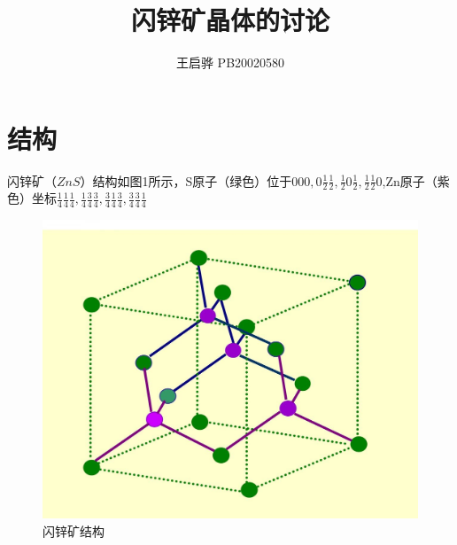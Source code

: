 \documentclass{article}
\title{\songti \zihao{2}\bfseries 闪锌矿晶体的讨论}
\author{王启骅 PB20020580}
\begin{document}
	\maketitle
		\section{结构}
	闪锌矿$ （ZnS） $结构如图1所示，S原子（绿色）位于$ 000,0\frac{1}{2}\frac{1}{2},\frac{1}{2}0\frac{1}{2},\frac{1}{2}\frac{1}{2}0 $,Zn原子（紫色）坐标$ \frac{1}{4}\frac{1}{4}\frac{1}{4},\frac{1}{4}\frac{3}{4}\frac{3}{4},\frac{3}{4}\frac{1}{4}\frac{3}{4},\frac{3}{4}\frac{3}{4}\frac{1}{4} $
	\begin{figure}[!h]
		
		\centering
		\includegraphics[scale=0.2]{结构}
		\caption{\heiti{}闪锌矿结构}
		
	\end{figure}
	
\end{document}
